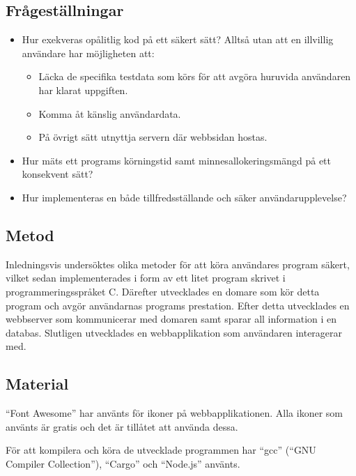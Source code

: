 \documentclass{article}
\begin{document}
\subsection{Frågeställningar}

\begin{itemize}
	\item Hur exekveras opålitlig kod på ett säkert sätt? Alltså utan att en
		illvillig användare har möjligheten att:
		\begin{itemize}
			\item Läcka de specifika testdata som körs för att avgöra huruvida
				användaren har klarat uppgiften.
			\item Komma åt känslig användardata.
			\item På övrigt sätt utnyttja servern där webbsidan hostas.
		\end{itemize}
	\item
		Hur mäts ett programs körningstid samt minnesallokeringsmängd på ett
		konsekvent sätt?
	\item
		Hur implementeras en både tillfredsställande och säker
		användarupplevelse?

\end{itemize}

\subsection{Metod}

Inledningsvis undersöktes olika metoder för att köra användares program säkert,
vilket sedan implementerades i form av ett litet program skrivet i
programmeringsspråket C. Därefter utvecklades en domare som kör detta program
och avgör användarnas programs prestation. Efter detta utvecklades en webbserver
som kommunicerar med domaren samt sparar all information i en databas. Slutligen
utvecklades en webbapplikation som användaren interagerar med.

\subsection{Material}

``Font Awesome'' har använts för ikoner på webbapplikationen. Alla ikoner som
använts är gratis och det är tillåtet att använda dessa.

För att kompilera och köra de utvecklade programmen har ``gcc'' (``GNU Compiler
Collection''), ``Cargo'' och ``Node.js'' använts.
\end{document}
